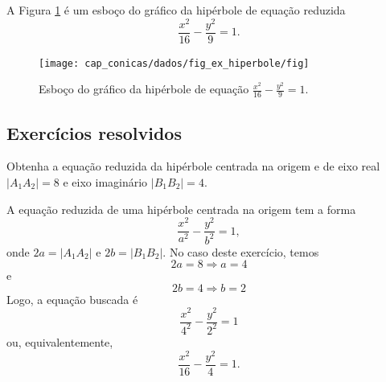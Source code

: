 \begin{ex}
  A Figura \ref{fig:ex_hiperbole} é um esboço do gráfico da hipérbole de equação reduzida
  \begin{equation}
    \frac{x^2}{16} - \frac{y^2}{9} = 1.
  \end{equation}

  \begin{figure}[H]
    \centering
    \texttt{[image: cap\_conicas/dados/fig\_ex\_hiperbole/fig]}
    \caption{Esboço do gráfico da hipérbole de equação $\displaystyle\frac{x^2}{16}-\frac{y^2}{9}=1$.}
    \label{fig:ex_hiperbole}
  \end{figure}  
\end{ex}

\subsection*{Exercícios resolvidos}

\begin{exeresol}
  Obtenha a equação reduzida da hipérbole centrada na origem e de eixo real $|A_1A_2|=8$ e eixo imaginário $|B_1B_2|=4$.
\end{exeresol}
\begin{resol}
  A equação reduzida de uma hipérbole centrada na origem tem a forma
  \begin{equation}
    \frac{x^2}{a^2} - \frac{y^2}{b^2} = 1,
  \end{equation}
  onde $2a = |A_1A_2|$ e $2b=|B_1B_2|$. No caso deste exercício, temos
  \begin{equation}
    2a = 8 \Rightarrow a = 4
  \end{equation}
  e
  \begin{equation}
    2b = 4 \Rightarrow b = 2
  \end{equation}
  Logo, a equação buscada é
  \begin{equation}
    \frac{x^2}{4^2} - \frac{y^2}{2^2} = 1
  \end{equation}
  ou, equivalentemente,
  \begin{equation}
    \frac{x^2}{16} - \frac{y^2}{4} = 1.
  \end{equation}  
\end{resol}

